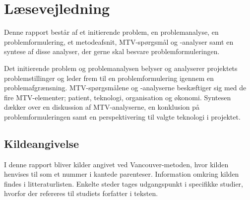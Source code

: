 \section*{Læsevejledning}
Denne rapport består af et initierende problem, en problemanalyse, en problemformulering, et metodeafsnit, MTV-spørgsmål og -analyser samt en syntese af disse analyser, der gerne skal besvare problemformuleringen. 

Det initierende problem og problemanalysen belyser og analyserer projektets problemstillinger og leder frem til en problemformulering igennem en problemafgrænsning. MTV-spørgsmålene og -analyserne beskæftiger sig med de fire MTV-elementer; patient, teknologi, organisation og økonomi. Syntesen dækker over en diskussion af MTV-analyserne, en konklusion på problemformuleringen samt en perspektivering til valgte teknologi i projektet. 


\subsection*{Kildeangivelse}
I denne rapport bliver kilder angivet ved Vancouver-metoden, hvor kilden henvises til som et nummer i kantede parenteser. Information omkring kilden findes i litteraturlisten. Enkelte steder tages udgangspunkt i specifikke studier, hvorfor der refereres til studiets forfatter i teksten. 



\newpage

